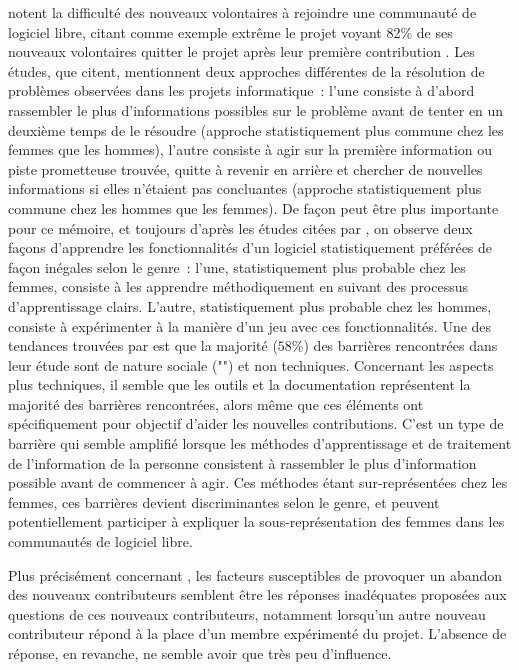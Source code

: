  notent la difficulté des nouveaux volontaires à rejoindre une communauté de
logiciel libre, citant comme exemple extrême le projet  voyant 82\% de ses nouveaux
volontaires quitter le projet après leur première contribution . Les
études, que \textcite[p.~1005]{barriers-2018} citent, mentionnent deux approches différentes de la résolution
de problèmes observées dans les projets informatique : l'une consiste à d'abord rassembler le plus
d'informations possibles sur le problème avant de tenter en un deuxième temps de le résoudre (approche
statistiquement plus commune chez les femmes que les hommes), l'autre consiste à agir sur la première
information ou piste prometteuse trouvée, quitte à revenir en arrière et chercher de nouvelles informations si
elles n'étaient pas concluantes (approche statistiquement plus commune chez les hommes que les femmes). De
façon peut être plus importante pour ce mémoire, et toujours d'après les études citées par
\textcite[p.~1005]{barriers-2018}, on observe deux façons d'apprendre les fonctionnalités d'un logiciel
statistiquement préférées de façon inégales selon le genre : l'une, statistiquement plus probable chez les
femmes, consiste à les apprendre méthodiquement en suivant des processus d'apprentissage clairs. L'autre,
statistiquement plus probable chez les hommes, consiste à expérimenter à la manière d'un jeu avec ces
fonctionnalités.  Une des tendances trouvées par \textcite[p.~1008]{barriers-2018}
est que la majorité ($58\%$) des barrières rencontrées dans leur étude sont de nature sociale
("") et non techniques. Concernant les aspects plus techniques, il semble que les
outils et la documentation représentent la majorité des barrières rencontrées, alors même que ces éléments ont
spécifiquement pour objectif d'aider les nouvelles contributions. C'est un type de barrière qui semble
amplifié lorsque les méthodes d'apprentissage et de traitement de l'information de la personne consistent à
rassembler le plus d'information possible avant de commencer à agir. Ces méthodes étant sur-représentées chez
les femmes, ces barrières devient discriminantes selon le genre, et peuvent potentiellement participer à
expliquer la sous-représentation des femmes dans les communautés de logiciel libre.

Plus précisément concernant , les facteurs susceptibles de provoquer un
abandon des nouveaux contributeurs semblent être les réponses inadéquates proposées aux questions de ces
nouveaux contributeurs, notamment lorsqu'un autre nouveau contributeur répond à la place d'un membre
expérimenté du projet. L'absence de réponse, en revanche, ne semble avoir que très peu d'influence.


